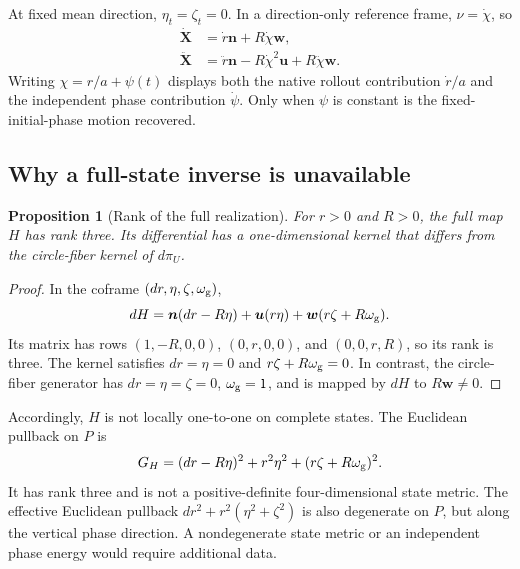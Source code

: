 \documentclass[11pt]{article}
\newtheorem{proposition}{Proposition}
\newcommand{\n}{\bm n}
\newcommand{\uu}{\bm u}
\newcommand{\ww}{\bm w}
\begin{document}
At fixed mean direction, $\eta_t=\zeta_t=0$. In a direction-only reference frame, $\nu=\dot\chi$, so
\begin{equation}
 \begin{aligned}
 \dot{\bm X}&=\dot r\n+R\dot\chi\ww,\\
 \ddot{\bm X}&=\ddot r\n-R\dot\chi^2\uu
                   +R\ddot\chi\ww.
 \end{aligned}
 \label{eq:fixedaxis}
\end{equation}
Writing $\chi=r/a+\psi(t)$ displays both the native rollout contribution $\dot r/a$ and the independent phase contribution $\dot\psi$. Only when $\psi$ is constant is the fixed-initial-phase motion recovered.

\subsection{Why a full-state inverse is unavailable}

\begin{proposition}[Rank of the full realization]
For $r>0$ and $R>0$, the full map $H$ has rank three. Its differential has a one-dimensional kernel that differs from the circle-fiber kernel of $d\pi_U$.
\end{proposition}
\begin{proof}
In the coframe $(dr,\eta,\zeta,\omega_{\rm g})$,
\begin{equation}
 dH=\n(dr-R\eta)+\uu(r\eta)
                         +\ww(r\zeta+R\omega_{\rm g}).
 \label{eq:dHfull}
\end{equation}
Its matrix has rows $(1,-R,0,0)$, $(0,r,0,0)$, and $(0,0,r,R)$, so its rank is three. The kernel satisfies $dr=\eta=0$ and $r\zeta+R\omega_{\rm g}=0$. In contrast, the circle-fiber generator has $dr=\eta=\zeta=0$, $\omega_{\rm g}=1$, and is mapped by $dH$ to $R\ww\ne0$.
\end{proof}

Accordingly, $H$ is not locally one-to-one on complete states. The Euclidean pullback on $P$ is
\begin{equation}
 G_H=(dr-R\eta)^2+r^2\eta^2
                    +(r\zeta+R\omega_{\rm g})^2.
 \label{eq:degenerate}
\end{equation}
It has rank three and is not a positive-definite four-dimensional state metric. The effective Euclidean pullback $dr^2+r^2(\eta^2+\zeta^2)$ is also degenerate on $P$, but along the vertical phase direction. A nondegenerate state metric or an independent phase energy would require additional data.
\end{document}

